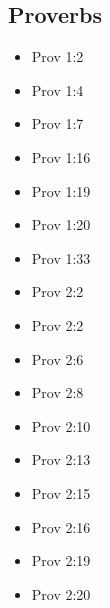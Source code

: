 \documentclass[14pt]{article}
\begin{document}
						\subsection{Proverbs}
						\begin{multicols}{2}\begin{itemize}

									\item Prov 1:2
									
									\item Prov 1:4
									
									\item Prov 1:7
									
									\item Prov 1:16
									
									\item Prov 1:19
									
									\item Prov 1:20
									
									\item Prov 1:33
									
									\item Prov 2:2
									
									\item Prov 2:2
									
									\item Prov 2:6
									
									\item Prov 2:8
									
									\item Prov 2:10
									
									\item Prov 2:13
									
									\item Prov 2:15
									
									\item Prov 2:16
									
									\item Prov 2:19
									
									\item Prov 2:20
									

\end{itemize}
\end{multicols}
\end{document}

